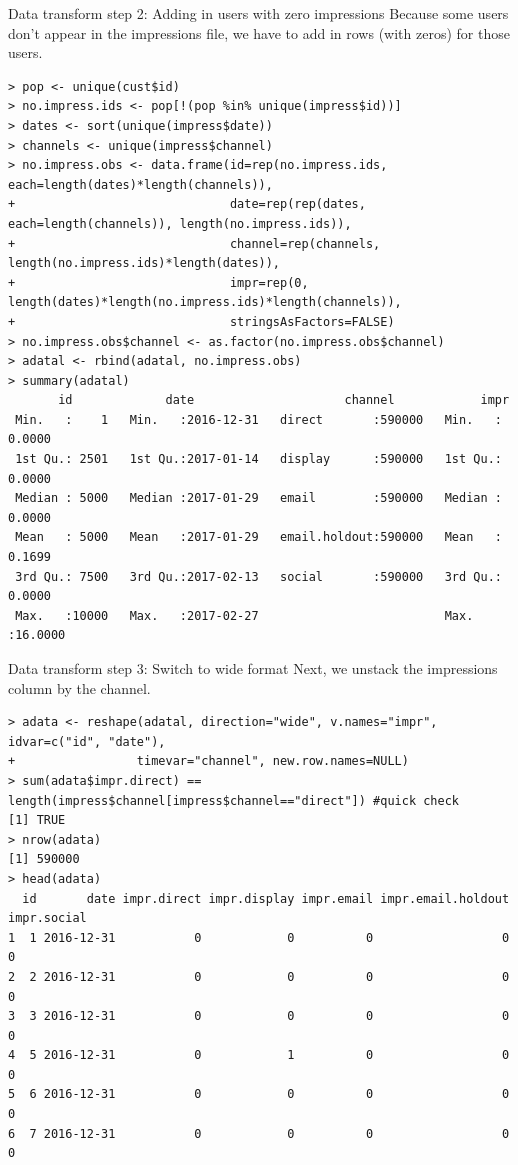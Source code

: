 \documentclass[10pt, aspectratio=169]{beamer}
\begin{document}
\begin{frame}[fragile]{Data transform step 2: Adding in users with zero impressions}
\footnotesize
Because some users don't appear in the impressions file, we have to add in rows (with zeros) for those 
users.
\begin{lstlisting}[basicstyle=\tiny\ttfamily]
> pop <- unique(cust$id)
> no.impress.ids <- pop[!(pop %in% unique(impress$id))]
> dates <- sort(unique(impress$date))
> channels <- unique(impress$channel)
> no.impress.obs <- data.frame(id=rep(no.impress.ids, each=length(dates)*length(channels)), 
+                              date=rep(rep(dates, each=length(channels)), length(no.impress.ids)), 
+                              channel=rep(channels, length(no.impress.ids)*length(dates)),
+                              impr=rep(0, length(dates)*length(no.impress.ids)*length(channels)), 
+                              stringsAsFactors=FALSE)
> no.impress.obs$channel <- as.factor(no.impress.obs$channel)
> adatal <- rbind(adatal, no.impress.obs)
> summary(adatal)
       id             date                     channel            impr        
 Min.   :    1   Min.   :2016-12-31   direct       :590000   Min.   : 0.0000  
 1st Qu.: 2501   1st Qu.:2017-01-14   display      :590000   1st Qu.: 0.0000  
 Median : 5000   Median :2017-01-29   email        :590000   Median : 0.0000  
 Mean   : 5000   Mean   :2017-01-29   email.holdout:590000   Mean   : 0.1699  
 3rd Qu.: 7500   3rd Qu.:2017-02-13   social       :590000   3rd Qu.: 0.0000  
 Max.   :10000   Max.   :2017-02-27                          Max.   :16.0000  
\end{lstlisting}
\end{frame}

\begin{frame}[fragile]{Data transform step 3: Switch to wide format}
\footnotesize
Next, we unstack the impressions column by the channel.
\begin{lstlisting}[basicstyle=\tiny\ttfamily]
> adata <- reshape(adatal, direction="wide", v.names="impr", idvar=c("id", "date"), 
+                 timevar="channel", new.row.names=NULL)
> sum(adata$impr.direct) == length(impress$channel[impress$channel=="direct"]) #quick check
[1] TRUE
> nrow(adata)
[1] 590000
> head(adata)
  id       date impr.direct impr.display impr.email impr.email.holdout impr.social
1  1 2016-12-31           0            0          0                  0           0
2  2 2016-12-31           0            0          0                  0           0
3  3 2016-12-31           0            0          0                  0           0
4  5 2016-12-31           0            1          0                  0           0
5  6 2016-12-31           0            0          0                  0           0
6  7 2016-12-31           0            0          0                  0           0
\end{lstlisting}
\end{frame}
\end{document}
